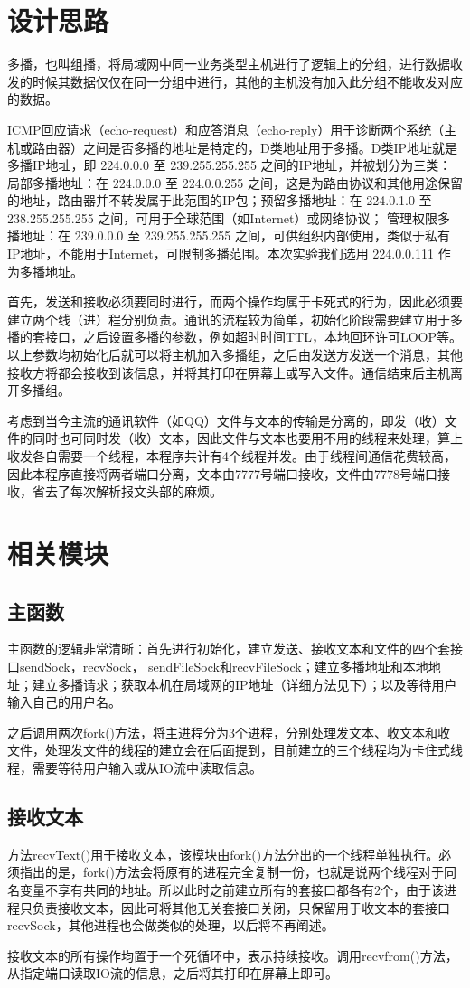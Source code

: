 \documentclass[UTF8]{ctexart}
\begin{document}
\section{设计思路}
多播，也叫组播，将局域网中同一业务类型主机进行了逻辑上的分组，进行数据收发的时候其数据仅仅在同一分组中进行，其他的主机没有加入此分组不能收发对应的数据。
\par
ICMP回应请求（echo-request）和应答消息（echo-reply）用于诊断两个系统（主机或路由器）之间是否多播的地址是特定的，D类地址用于多播。D类IP地址就是多播IP地址，即 224.0.0.0 至 239.255.255.255 之间的IP地址，并被划分为三类：局部多播地址：在 224.0.0.0 至 224.0.0.255 之间，这是为路由协议和其他用途保留的地址，路由器并不转发属于此范围的IP包；预留多播地址：在 224.0.1.0 至 238.255.255.255 之间，可用于全球范围（如Internet）或网络协议；
管理权限多播地址：在 239.0.0.0 至 239.255.255.255 之间，可供组织内部使用，类似于私有IP地址，不能用于Internet，可限制多播范围。本次实验我们选用 224.0.0.111 作为多播地址。
\par
首先，发送和接收必须要同时进行，而两个操作均属于卡死式的行为，因此必须要建立两个线（进）程分别负责。通讯的流程较为简单，初始化阶段需要建立用于多播的套接口，之后设置多播的参数，例如超时时间TTL，本地回环许可LOOP等。以上参数均初始化后就可以将主机加入多播组，之后由发送方发送一个消息，其他接收方将都会接收到该信息，并将其打印在屏幕上或写入文件。通信结束后主机离开多播组。
\par
考虑到当今主流的通讯软件（如QQ）文件与文本的传输是分离的，即发（收）文件的同时也可同时发（收）文本，因此文件与文本也要用不用的线程来处理，算上收发各自需要一个线程，本程序共计有4个线程并发。由于线程间通信花费较高，因此本程序直接将两者端口分离，文本由7777号端口接收，文件由7778号端口接收，省去了每次解析报文头部的麻烦。
\section{相关模块}
\subsection{主函数}
主函数的逻辑非常清晰：首先进行初始化，建立发送、接收文本和文件的四个套接口sendSock，recvSock， sendFileSock和recvFileSock；建立多播地址和本地地址；建立多播请求；获取本机在局域网的IP地址（详细方法见下）；以及等待用户输入自己的用户名。
\par
之后调用两次fork()方法，将主进程分为3个进程，分别处理发文本、收文本和收文件，处理发文件的线程的建立会在后面提到，目前建立的三个线程均为卡住式线程，需要等待用户输入或从IO流中读取信息。
\subsection{接收文本}
方法recvText()用于接收文本，该模块由fork()方法分出的一个线程单独执行。必须指出的是，fork()方法会将原有的进程完全复制一份，也就是说两个线程对于同名变量不享有共同的地址。所以此时之前建立所有的套接口都各有2个，由于该进程只负责接收文本，因此可将其他无关套接口关闭，只保留用于收文本的套接口recvSock，其他进程也会做类似的处理，以后将不再阐述。
\par
接收文本的所有操作均置于一个死循环中，表示持续接收。调用recvfrom()方法，从指定端口读取IO流的信息，之后将其打印在屏幕上即可。
\end{document}
